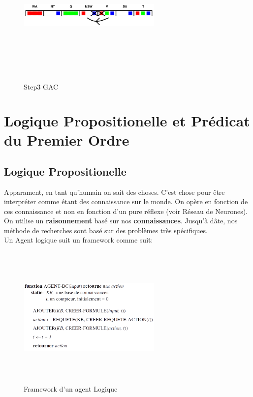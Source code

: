 \documentclass[oneside]{book}
\begin{document}
\begin{figure}[!ht]
\centering
\includegraphics[width = 7cm, height = 7cm, keepaspectratio]{gac3.png}
\caption{Step3 GAC}
\label{fig:gac3}
\end{figure}
\chapter{Logique Propositionelle et Prédicat du Premier Ordre}
\section{Logique Propositionelle}
Apparament, en tant qu'humain on sait des choses. C'est chose pour être interpréter comme étant des connaissance sur le monde. On opère en fonction de ces connaissance et non en fonction d'un pure réflexe (voir Réseau de Neurones). On utilise un \textbf{raisonnement} basé sur nos \textbf{connaissances}. Jusqu'à dâte, nos méthode de recherches sont basé sur des problèmes très spécifiques.\\

Un Agent logique suit un framework comme suit:\\

\begin{figure}[h!t]
\centering
\includegraphics[width = 7cm, height = 7cm, keepaspectratio]{agent_logique.png}
\caption{Framework d'un agent Logique}
\label{fig:agent_logique}
\end{figure}
\end{document}
